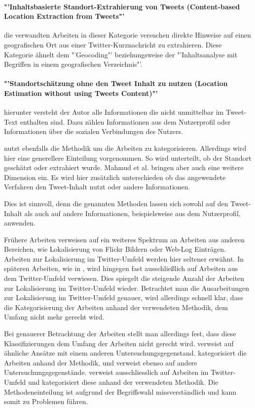 		\paragraph*{"'Inhaltsbasierte Standort-Extrahierung von Tweets (Content-based Location Extraction from Tweets"'} die verwandten Arbeiten in dieser Kategorie versuchen direkte Hinweise auf einen geografischen Ort aus einer Twitter-Kurznachricht zu extrahieren. 
		Diese Kategorie ähnelt dem "'Geocoding"' beziehungsweise der "'Inhaltsanalyse mit Begriffen in einem geografischen Verzeichnis"'. 

		\paragraph*{"'Standortschätzung ohne den Tweet Inhalt zu nutzen (Location Estimation without using Tweets Content)"'} hierunter versteht der Autor alle Informationen die nicht unmittelbar im Tweet-Text enthalten sind. Dazu zählen Informationen aus dem Nutzerprofil oder Informationen über die sozialen Verbindungen des Nutzers.


		\cite{Mahmud2012} nutzt ebenfalls die Methodik um die Arbeiten zu kategorisieren. 
		Allerdings wird hier eine generellere Einteilung vorgenommen. 
		So wird unterteilt, ob der Standort geschätzt oder extrahiert wurde.  
		Mahmud et al. bringen aber auch eine weitere Dimension ein. 
		Es wird hier zusätzlich unterschieden ob das angewendete Verfahren den Tweet-Inhalt nutzt oder andere Informationen. 

		Dies ist sinnvoll, denn die genannten Methoden lassen sich sowohl auf den Tweet-Inhalt als auch auf andere Informationen, beispielsweise aus dem Nutzerprofil, anwenden. 
		
		Frühere Arbeiten verweisen auf ein weiteres Spektrum an Arbeiten aus anderen Bereichen, wie Lokalisierung von Flickr Bildern oder Web-Log Einträgen.
		Arbeiten zur Lokalisierung im Twitter-Umfeld werden hier seltener erwähnt. 
		In späteren Arbeiten, wie in \cite{Priedhorsky2013}, wird hingegen fast ausschließlich auf Arbeiten aus dem Twitter-Umfeld verwiesen. 
		Dies spiegelt die steigende Anzahl der Arbeiten zur Lokalisierung im Twitter-Umfeld wieder.
		Betrachtet man die Ausarbeitungen zur Lokalisierung im Twitter-Umfeld genauer, wird allerdings schnell klar, dass die Kategorisierung der Arbeiten anhand der verwendeten Methodik, dem Umfang nicht mehr gerecht wird. 
		
		Bei genauerer Betrachtung der Arbeiten stellt man allerdings fest, dass diese Klassifizierungen dem Umfang der Arbeiten nicht gerecht wird. 
		\cite{Hecht2011} verweist auf ähnliche Ansätze mit einem anderen Untersuchungsgegenstand.
		\cite{Cheng2010} kategorisiert die Arbeiten anhand der Methodik, und verweist ebenso auf andere Untersuchungsgegenstände. 
		\cite{Priedhorsky2013} verweist ausschliesslich auf Arbeiten im Twitter-Umfeld und kategorisiert diese anhand der verwendeten Methodik. 
		Die Methodeneinteilung ist aufgrund der Begriffswahl missverständlich und kann somit zu Problemen führen. 

